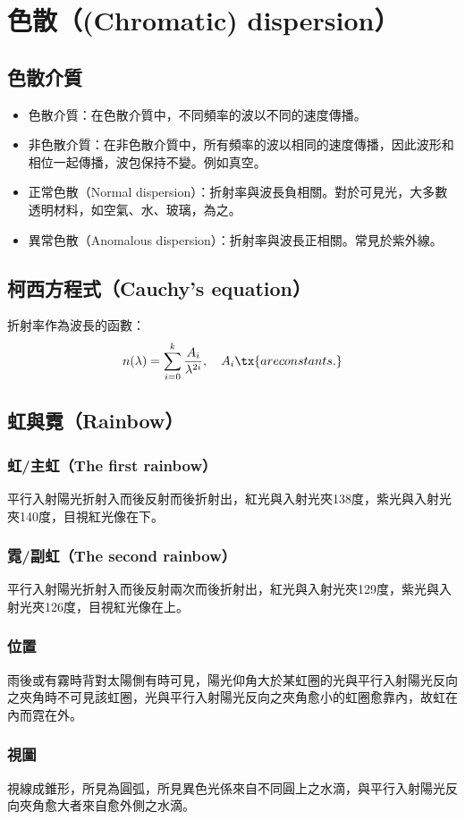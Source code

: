 \documentclass[a4paper,12pt]{report}
\begin{document}
\section{色散（(Chromatic) dispersion）}
\subsection{色散介質}
\begin{itemize}
\item 色散介質：在色散介質中，不同頻率的波以不同的速度傳播。
\item 非色散介質：在非色散介質中，所有頻率的波以相同的速度傳播，因此波形和相位一起傳播，波包保持不變。例如真空。
\item 正常色散（Normal dispersion）：折射率與波長負相關。對於可見光，大多數透明材料，如空氣、水、玻璃，為之。
\item 異常色散（Anomalous dispersion）：折射率與波長正相關。常見於紫外線。
\end{itemize}
\subsection{柯西方程式（Cauchy's equation）}
折射率作為波長的函數：
\[n(\lambda)=\sum_{i=0}^k\frac{A_i}{\lambda^{2i}}, \quad A_i \tx{ are constants.} \]
\subsection{虹與霓（Rainbow）}
\subsubsection{虹/主虹（The first rainbow）}
平行入射陽光折射入而後反射而後折射出，紅光與入射光夾138度，紫光與入射光夾140度，目視紅光像在下。
\subsubsection{霓/副虹（The second rainbow）}
平行入射陽光折射入而後反射兩次而後折射出，紅光與入射光夾129度，紫光與入射光夾126度，目視紅光像在上。
\subsubsection{位置}
雨後或有霧時背對太陽側有時可見，陽光仰角大於某虹圈的光與平行入射陽光反向之夾角時不可見該虹圈，光與平行入射陽光反向之夾角愈小的虹圈愈靠內，故虹在內而霓在外。
\subsubsection{視圖}
視線成錐形，所見為圓弧，所見異色光係來自不同圓上之水滴，與平行入射陽光反向夾角愈大者來自愈外側之水滴。
\end{document}

